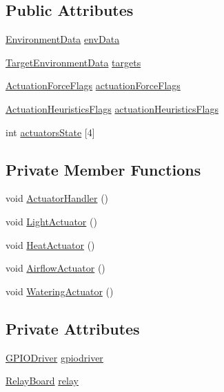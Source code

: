 \subsection*{Public Attributes}
\begin{DoxyCompactItemize}
\item 
\hyperlink{structEnvironmentData}{Environment\+Data} \hyperlink{classController_ac99088334f56588243867ca1c18f9633}{env\+Data}
\item 
\hyperlink{structTargetEnvironmentData}{Target\+Environment\+Data} \hyperlink{classController_a8f2fb8295fd3da6ebc8bdb0f25036322}{targets}
\item 
\hyperlink{structActuationForceFlags}{Actuation\+Force\+Flags} \hyperlink{classController_a5af467109ecf31a0e63213ff9e5d0d72}{actuation\+Force\+Flags}
\item 
\hyperlink{structActuationHeuristicsFlags}{Actuation\+Heuristics\+Flags} \hyperlink{classController_ae3d5121f2fa076d362ac5d56feae17d2}{actuation\+Heuristics\+Flags}
\item 
int \hyperlink{classController_a23064d241b70e672c4c1d3db9671bd5e}{actuators\+State} \mbox{[}4\mbox{]}
\end{DoxyCompactItemize}
\subsection*{Private Member Functions}
\begin{DoxyCompactItemize}
\item 
void \hyperlink{classController_acd0145853d19eaf3ef9d15f6203ace69}{Actuator\+Handler} ()
\item 
void \hyperlink{classController_ad45f507b92936f2964524270c62c9d07}{Light\+Actuator} ()
\item 
void \hyperlink{classController_af2f697200bc977e9115aff768d13fd23}{Heat\+Actuator} ()
\item 
void \hyperlink{classController_ae27c7681db8370782c96769a35e09230}{Airflow\+Actuator} ()
\item 
void \hyperlink{classController_a92e03a719890c12f2272b8a6b904d6e1}{Watering\+Actuator} ()
\end{DoxyCompactItemize}
\subsection*{Private Attributes}
\begin{DoxyCompactItemize}
\item 
\hyperlink{classGPIODriver}{G\+P\+I\+O\+Driver} \hyperlink{classController_aa3d6dde5a09dfc1a34bfaee1e7fa3434}{gpiodriver}
\item 
\hyperlink{classRelayBoard}{Relay\+Board} \hyperlink{classController_aa3f1d7aae706a5440adf520cbd7fb216}{relay}
\end{DoxyCompactItemize}


